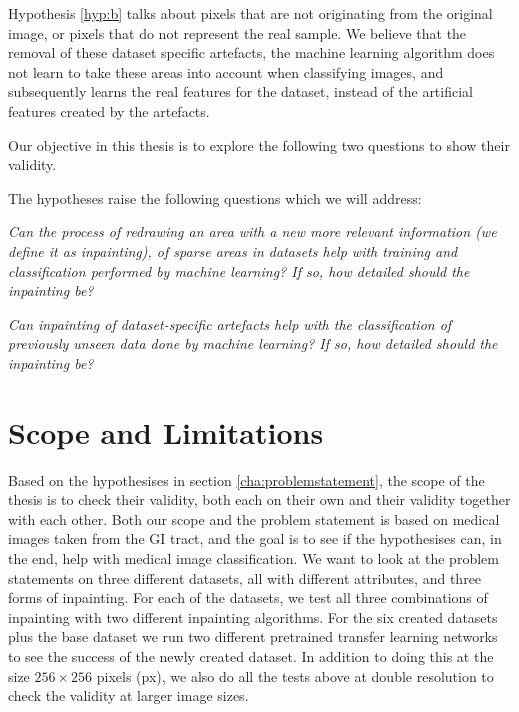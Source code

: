\noindent
Hypothesis \ref{hyp:b} talks about pixels that are not originating from the original image, or pixels that do not represent the real sample. We believe that the removal of these dataset specific artefacts, the machine learning algorithm does not learn to take these areas into account when classifying images, and subsequently learns the real features for the dataset, instead of the artificial features created by the artefacts.


Our objective in this thesis is to explore the following two questions to show their validity.

The hypotheses raise the following questions which we will address:\\

\begin{que} \label{que:a}
\noindent \textit{Can the process of redrawing an area with a new more relevant information (we define it as inpainting), of sparse areas in datasets help with training and classification performed by machine learning? If so, how detailed should the inpainting be?}\\
\end{que}

\begin{que} \label{que:b}
\noindent \textit{Can inpainting of dataset-specific artefacts help with the classification of previously unseen data done by machine learning? If so, how detailed should the inpainting be?}
\end{que}

\section{Scope and Limitations}
Based on the hypothesises in section \ref{cha:problemstatement}, the scope of the thesis is to check their validity, both each on their own and their validity together with each other. 
Both our scope and the problem statement is based on medical images taken from the GI tract, and the goal is to see if the hypothesises can, in the end, help with medical image classification.
We want to look at the problem statements on three different datasets, all with different attributes, and three forms of inpainting.
For each of the datasets, we test all three combinations of inpainting with two different inpainting algorithms. 
For the six created datasets plus the base dataset we run two different pretrained transfer learning networks to see the success of the newly created dataset.
In addition to doing this at the size $256 \times 256$ pixels (px), we also do all the tests above at double resolution to check the validity at larger image sizes.

